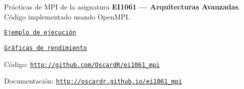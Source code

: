 Prácticas de M\-P\-I de la asignatura {\bfseries E\-I1061 — Arquitecturas Avanzadas}. Código implementado usando Open\-M\-P\-I.


\begin{DoxyItemize}
\item \href{md_usage.html}{\tt Ejemplo de ejecución}
\end{DoxyItemize}


\begin{DoxyItemize}
\item \href{md_performance.html}{\tt Gráficas de rendimiento}
\end{DoxyItemize}


\begin{DoxyItemize}
\item Código\-: \href{http://github.com/OscardR/ei1061_mpi}{\tt http\-://github.\-com/\-Oscard\-R/ei1061\-\_\-mpi}
\end{DoxyItemize}


\begin{DoxyItemize}
\item Documentación\-: \href{http://oscardr.github.io/ei1061_mpi}{\tt http\-://oscardr.\-github.\-io/ei1061\-\_\-mpi} 
\end{DoxyItemize}